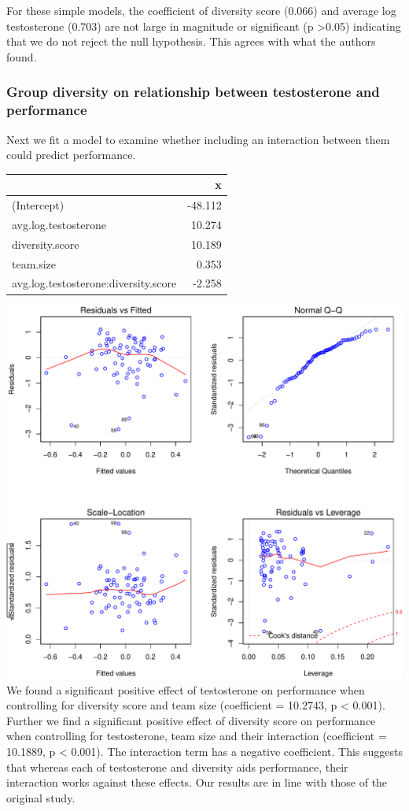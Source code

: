 \documentclass[]{article}
\begin{document}
For these simple models, the coefficient of diversity score (0.066) and
average log testosterone (0.703) are not large in magnitude or
significant (p \textgreater{}0.05) indicating that we do not reject the
null hypothesis. This agrees with what the authors found.

\hypertarget{group-diversity-on-relationship-between-testosterone-and-performance}{%
\subsubsection{Group diversity on relationship between testosterone and
performance}\label{group-diversity-on-relationship-between-testosterone-and-performance}}

Next we fit a model to examine whether including an interaction between
them could predict performance.

\begin{longtable}[]{@{}lr@{}}
\toprule
& x\tabularnewline
\midrule
\endhead
(Intercept) & -48.112\tabularnewline
avg.log.testosterone & 10.274\tabularnewline
diversity.score & 10.189\tabularnewline
team.size & 0.353\tabularnewline
avg.log.testosterone:diversity.score & -2.258\tabularnewline
\bottomrule
\end{longtable}

\includegraphics{19_10_02_hw5_q1_files/figure-latex/test_model-1.pdf} We
found a significant positive effect of testosterone on performance when
controlling for diversity score and team size (coefficient = 10.2743, p
\textless{} 0.001). Further we find a significant positive effect of
diversity score on performance when controlling for testosterone, team
size and their interaction (coefficient = 10.1889, p \textless{} 0.001).
The interaction term has a negative coefficient. This suggests that
whereas each of testosterone and diversity aids performance, their
interaction works against these effects. Our results are in line with
those of the original study.
\end{document}
